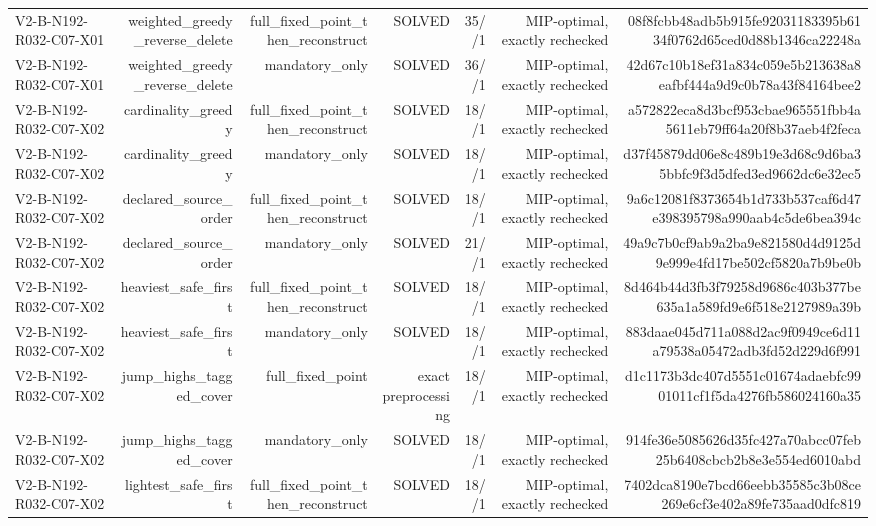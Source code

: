 {\begin{longtable}{lrrrrrr}
V2-B-N192-R032-C07-X01 & weighted\_greedy\_reverse\_delete & full\_fixed\_point\_then\_reconstruct & SOLVED & 35//1 & MIP-optimal, exactly rechecked & 08f8fcbb48adb5b915fe92031183395b6134f0762d65ced0d88b1346ca22248a \\
V2-B-N192-R032-C07-X01 & weighted\_greedy\_reverse\_delete & mandatory\_only & SOLVED & 36//1 & MIP-optimal, exactly rechecked & 42d67c10b18ef31a834c059e5b213638a8eafbf444a9d9c0b78a43f84164bee2 \\
V2-B-N192-R032-C07-X02 & cardinality\_greedy & full\_fixed\_point\_then\_reconstruct & SOLVED & 18//1 & MIP-optimal, exactly rechecked & a572822eca8d3bcf953cbae965551fbb4a5611eb79ff64a20f8b37aeb4f2feca \\
V2-B-N192-R032-C07-X02 & cardinality\_greedy & mandatory\_only & SOLVED & 18//1 & MIP-optimal, exactly rechecked & d37f45879dd06e8c489b19e3d68c9d6ba35bbfc9f3d5dfed3ed9662dc6e32ec5 \\
V2-B-N192-R032-C07-X02 & declared\_source\_order & full\_fixed\_point\_then\_reconstruct & SOLVED & 18//1 & MIP-optimal, exactly rechecked & 9a6c12081f8373654b1d733b537caf6d47e398395798a990aab4c5de6bea394c \\
V2-B-N192-R032-C07-X02 & declared\_source\_order & mandatory\_only & SOLVED & 21//1 & MIP-optimal, exactly rechecked & 49a9c7b0cf9ab9a2ba9e821580d4d9125d9e999e4fd17be502cf5820a7b9be0b \\
V2-B-N192-R032-C07-X02 & heaviest\_safe\_first & full\_fixed\_point\_then\_reconstruct & SOLVED & 18//1 & MIP-optimal, exactly rechecked & 8d464b44d3fb3f79258d9686c403b377be635a1a589fd9e6f518e2127989a39b \\
V2-B-N192-R032-C07-X02 & heaviest\_safe\_first & mandatory\_only & SOLVED & 18//1 & MIP-optimal, exactly rechecked & 883daae045d711a088d2ac9f0949ce6d11a79538a05472adb3fd52d229d6f991 \\
V2-B-N192-R032-C07-X02 & jump\_highs\_tagged\_cover & full\_fixed\_point & exact preprocessing & 18//1 & MIP-optimal, exactly rechecked & d1c1173b3dc407d5551c01674adaebfc9901011cf1f5da4276fb586024160a35 \\
V2-B-N192-R032-C07-X02 & jump\_highs\_tagged\_cover & mandatory\_only & SOLVED & 18//1 & MIP-optimal, exactly rechecked & 914fe36e5085626d35fc427a70abcc07feb25b6408cbcb2b8e3e554ed6010abd \\
V2-B-N192-R032-C07-X02 & lightest\_safe\_first & full\_fixed\_point\_then\_reconstruct & SOLVED & 18//1 & MIP-optimal, exactly rechecked & 7402dca8190e7bcd66eebb35585c3b08ce269e6cf3e402a89fe735aad0dfc819 \\

\end{longtable}}
